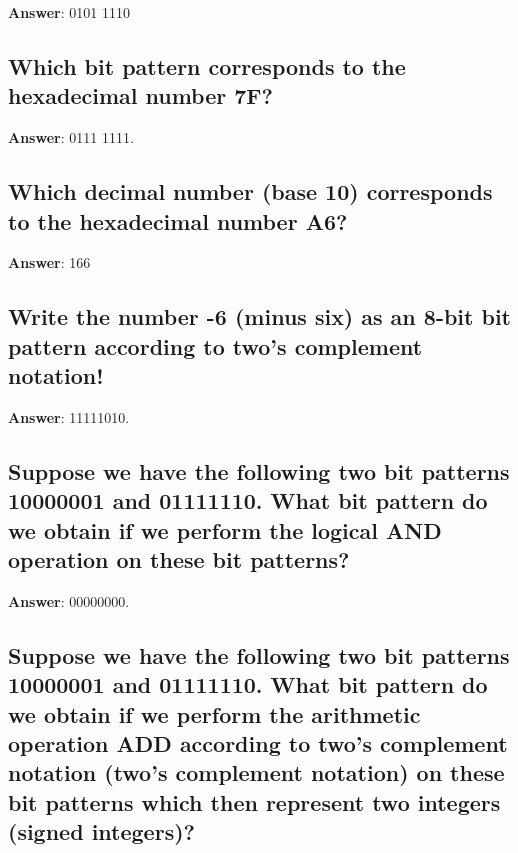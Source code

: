 \documentclass[a4paper,11pt,oneside]{article}
\begin{document}
\begin{sloppypar}
\label{q:399:sa:en:True}

\textbf{Answer}: 0101 1110



\subsection{Which bit pattern corresponds to the hexadecimal number 7F?}

\label{q:400:sa:en:True}

\textbf{Answer}: 0111 1111.



\subsection{Which decimal number (base 10) corresponds to the hexadecimal number  A6?}

\label{q:401:sa:en:True}

\textbf{Answer}: 166



\subsection{Write the number -6 (minus six) as an 8-bit bit pattern according to two's complement notation!}

\label{q:402:sa:en:True}

\textbf{Answer}: 11111010.



\subsection{Suppose we have the following two bit patterns 10000001 and 01111110. What bit pattern do we obtain if we perform the logical AND operation on these bit patterns?}

\label{q:403:sa:en:True}

\textbf{Answer}: 00000000.



\subsection{Suppose we have the following two bit patterns 10000001 and 01111110. What bit pattern do we obtain if we perform the arithmetic operation ADD according to two's complement notation (two's complement notation) on these bit patterns which then represent two integers (signed integers)?}


\end{sloppypar}
\end{document}
